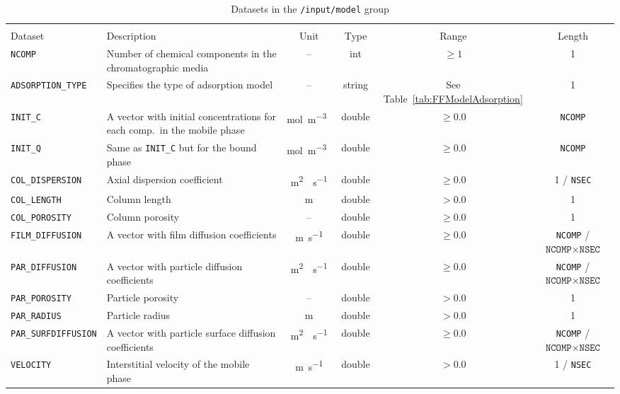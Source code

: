 \begin{table}[!ht]
\footnotesize
\begin{tabu}to \linewidth[m]{lX[m]cccc} \toprule
{} \\
\rowfont[c]\normalfont Dataset & Description & Unit & Type & Range & Length \everyrow{\midrule}\\
\texttt{NCOMP}& Number of chemical components in the chromatographic media & -- & int  & $\geq 1$ & 1 \\
\texttt{ADSORPTION\_TYPE} & Specifies the type of adsorption model & -- & string & See Table~\ref{tab:FFModelAdsorption} & 1 \\
\texttt{INIT\_C} & A vector with initial concentrations for each comp.\ in the mobile phase & \si{\mol\per\cubic\metre{}} & double & $\geq 0.0$ & \texttt{NCOMP}\\
\texttt{INIT\_Q} & Same as \texttt{INIT\_C} but for the bound phase & \si{\mol\per\cubic\metre{}} & double & $\geq 0.0$ & \texttt{NCOMP}\\
\texttt{COL\_DISPERSION} & Axial dispersion coefficient & \si{\square\metre{}\per\second} & double & $\geq 0.0$ & 1 / \texttt{NSEC}\\
\texttt{COL\_LENGTH} & Column length & \si{\metre} & double & $> 0.0$ & 1\\
\texttt{COL\_POROSITY} & Column porosity & -- & double & $\geq 0.0$ & 1\\
\texttt{FILM\_DIFFUSION} & A vector with film diffusion coefficients & \si{\metre\per\second} & double & $\geq 0.0$ & \texttt{NCOMP} / {$\texttt{NCOMP} \times \texttt{NSEC}$}\\
\texttt{PAR\_DIFFUSION} & A vector with particle diffusion coefficients & \si{\square\metre{}\per\second} & double & $\geq 0.0$ & \texttt{NCOMP} / {$\texttt{NCOMP} \times \texttt{NSEC}$}\\
\texttt{PAR\_POROSITY} & Particle porosity & -- & double & $> 0.0$ & 1\\
\texttt{PAR\_RADIUS} & Particle radius & \si{\metre} & double & $> 0.0$ & 1\\
\texttt{PAR\_SURFDIFFUSION} & A vector with particle surface diffusion coefficients & \si{\square\metre{}\per\second} & double & $\geq 0.0$ & \texttt{NCOMP} / {$\texttt{NCOMP} \times \texttt{NSEC}$}\\
\texttt{VELOCITY} & Interstitial velocity of the mobile phase & \si{\metre\per\second} & double & $> 0.0$ & 1 / \texttt{NSEC}\everyrow{}\\
\bottomrule
\end{tabu}
\caption{\label{tab:FFModel}Datasets in the \texttt{/input/model} group}
\end{table}

